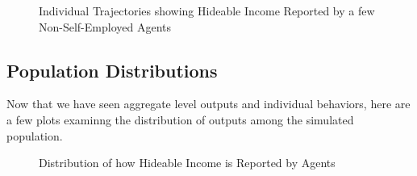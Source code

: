 \documentclass{article}
\begin{document}
	
  \begin{figure}[ht]
		\caption{Individual Trajectories showing Hideable Income Reported by a few Non-Self-Employed Agents}
	\end{figure}
	
\subsection{Population Distributions}
Now that we have seen aggregate level outputs and individual behaviors, here are a few plots examinng the distribution of outputs among the simulated population. 	
  
  \begin{figure}[ht]
		\caption{Distribution of how Hideable Income is Reported by Agents}
	\end{figure}
	
\end{document}
